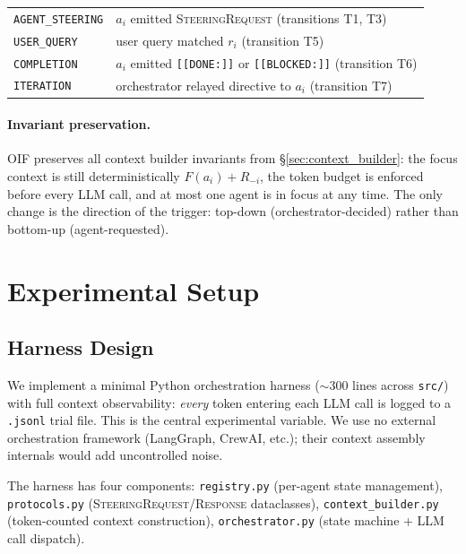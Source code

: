 \documentclass{article}
\begin{document}
\begin{center}
\small
\begin{tabular}{ll}
\texttt{AGENT\_STEERING} & $a_i$ emitted \textsc{SteeringRequest} (transitions T1, T3) \\
\texttt{USER\_QUERY}     & user query matched $r_i$ (transition T5) \\
\texttt{COMPLETION}      & $a_i$ emitted \texttt{[[DONE:]]} or \texttt{[[BLOCKED:]]} (transition T6) \\
\texttt{ITERATION}       & orchestrator relayed directive to $a_i$ (transition T7) \\
\end{tabular}
\end{center}

\paragraph{Invariant preservation.}
OIF preserves all context builder invariants from \S\ref{sec:context_builder}:
the focus context is still deterministically $F(a_i) + R_{-i}$, the
token budget is enforced before every LLM call, and at most one agent is
in focus at any time.
The only change is the direction of the trigger: top-down
(orchestrator-decided) rather than bottom-up (agent-requested).

\section{Experimental Setup}
\label{sec:experiments}

\subsection{Harness Design}
\label{sec:harness}

We implement a minimal Python orchestration harness ($\sim$300 lines
across \texttt{src/}) with full context observability: \emph{every} token
entering each LLM call is logged to a \texttt{.jsonl} trial file.
This is the central experimental variable.
We use no external orchestration framework (LangGraph, CrewAI, etc.);
their context assembly internals would add uncontrolled noise.

The harness has four components:
\texttt{registry.py} (per-agent state management),
\texttt{protocols.py} (\textsc{SteeringRequest/Response} dataclasses),
\texttt{context\_builder.py} (token-counted context construction),
\texttt{orchestrator.py} (state machine + LLM call dispatch).
\end{document}
